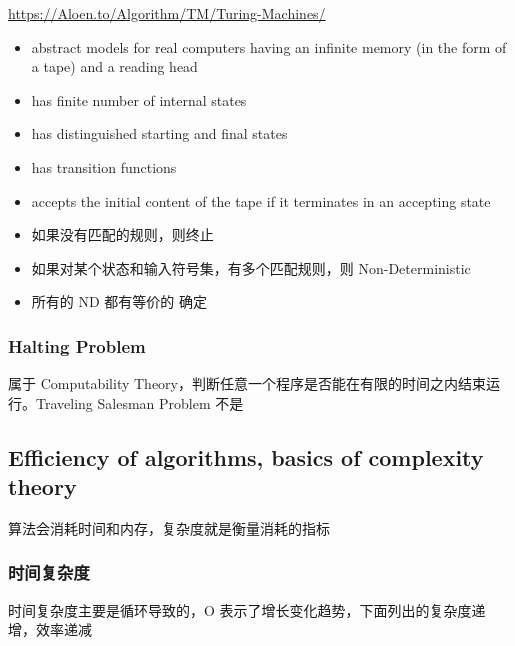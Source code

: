 \documentclass[11pt,journal,compsoc]{IEEEtran}
\begin{document}
\url{https://Aloen.to/Algorithm/TM/Turing-Machines/}

\begin{itemize}
    \item abstract models for real computers having an infinite memory (in the form of a tape) and a reading head

    \item has finite number of internal states

    \item has distinguished starting and final states

    \item has transition functions
\end{itemize}

\begin{itemize}
    \item accepts the initial content of the tape if it terminates in an accepting state

    \item 如果没有匹配的规则，则终止

    \item 如果对某个状态和输入符号集，有多个匹配规则，则 Non-Deterministic

    \item 所有的 ND 都有等价的 确定
\end{itemize}


\subsubsection{Halting Problem}

属于 Computability Theory，判断任意一个程序是否能在有限的时间之内结束运行。Traveling Salesman Problem 不是


\subsection{Efficiency of algorithms, basics of complexity theory}

算法会消耗时间和内存，复杂度就是衡量消耗的指标


\subsubsection{时间复杂度}

时间复杂度主要是循环导致的，O 表示了增长变化趋势，下面列出的复杂度递增，效率递减
\end{document}
